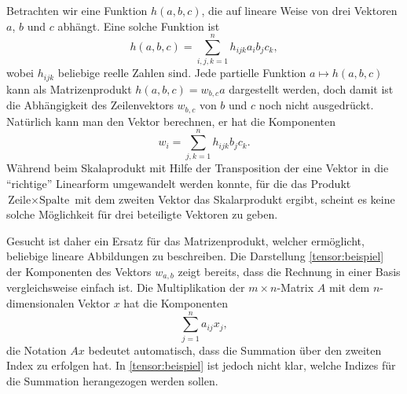 Betrachten wir eine Funktion $h(a,b,c)$, die auf lineare Weise von
drei Vektoren $a$, $b$ und $c$ abhängt.
Eine solche Funktion ist
\[
h(a,b,c)=\sum_{i,j,k=1}^n h_{ijk} a_i b_j c_k,
\]
wobei $h_{ijk}$ beliebige reelle Zahlen sind.
Jede partielle Funktion $a\mapsto h(a,b,c)$ kann als Matrizenprodukt
$h(a,b,c)=w_{b,c}a$ dargestellt werden, doch damit ist die Abhängigkeit des
Zeilenvektors $w_{b,c}$ von $b$ und $c$ noch nicht ausgedrückt.
Natürlich kann man den Vektor berechnen, er hat die Komponenten
\begin{equation}
w_i = \sum_{j,k=1}^n h_{ijk}b_jc_k.
\label{tensor:beispiel}
\end{equation}
Während beim Skalaprodukt mit Hilfe der Transposition der eine Vektor
in die ``richtige'' Linearform umgewandelt werden konnte, für die das
Produkt $\text{Zeile}\times\text{Spalte}$ mit dem zweiten Vektor das
Skalarprodukt ergibt, scheint es keine solche Möglichkeit für drei
beteiligte Vektoren zu geben.

Gesucht ist daher ein Ersatz für das Matrizenprodukt, welcher ermöglicht,
beliebige lineare Abbildungen zu beschreiben.
Die Darstellung \eqref{tensor:beispiel} der Komponenten des Vektors
$w_{a,b}$ zeigt bereits, dass die Rechnung in einer Basis vergleichsweise
einfach ist.
Die Multiplikation der $m\times n$-Matrix $A$ mit dem $n$-dimensionalen
Vektor $x$ hat die Komponenten
\[
\sum_{j=1}^n a_{ij}x_j,
\]
die Notation $Ax$ bedeutet automatisch, dass die Summation über den zweiten
Index zu erfolgen hat.
In \eqref{tensor:beispiel} ist jedoch nicht klar, welche Indizes für
die Summation herangezogen werden sollen.

